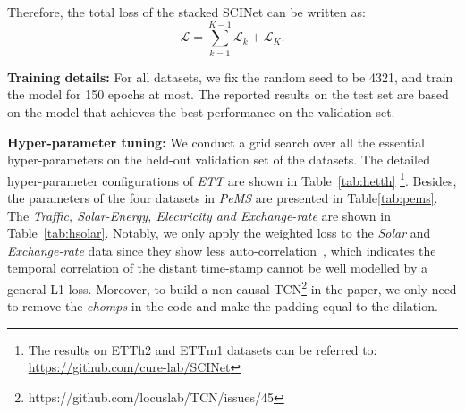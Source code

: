 \documentclass{article}
\begin{document}
Therefore, the total loss of the stacked SCINet can be written as:
\begin{equation}
     \mathcal{L} = \sum_{k=1}^{K-1}\mathcal{L}_{k} +  \mathcal{L}_{K}.
\end{equation}

\textbf{Training details:}
For all datasets, we fix the random seed to be 4321, and train the model for 150 epochs at most. The reported results on the test set are based on the model that achieves the best performance on the validation set.





\textbf{Hyper-parameter tuning:}
We conduct a grid search over all the essential hyper-parameters on the held-out validation set of the datasets. The detailed hyper-parameter configurations of \emph{ETT} are shown in Table~\ref{tab:hetth} \footnote{The results on ETTh2 and ETTm1 datasets can be referred to: \url{https://github.com/cure-lab/SCINet} }. Besides, the parameters of the four datasets in \emph{PeMS} are presented in  Table\ref{tab:pems}. The \emph{Traffic, Solar-Energy, Electricity and Exchange-rate} are shown in Table~\ref{tab:hsolar}.  
Notably, we only apply the weighted loss to the \textit{Solar} and \textit{Exchange-rate} data since they show less auto-correlation~\cite{Lai2018ModelingLA}, which indicates the temporal correlation of the distant time-stamp cannot be well modelled by a general L1 loss. 
Moreover, to build a non-causal TCN\footnote{https://github.com/locuslab/TCN/issues/45} in the paper, we only need to remove the \emph{chomps} in the code and make the padding equal to the dilation.







\newpage
\end{document}
